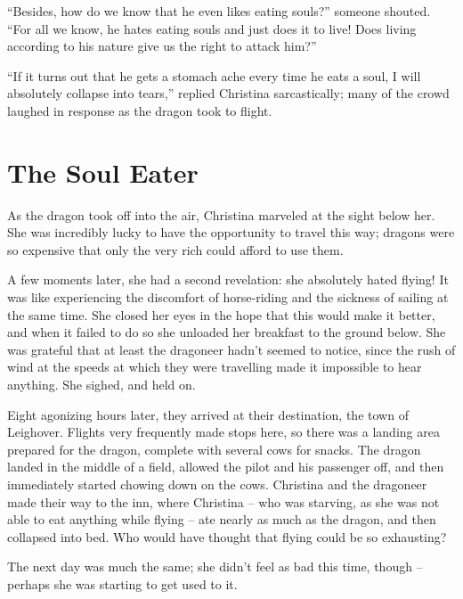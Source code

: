 \documentclass[showtrims,b6paper,draft,10pt]{memoir}
\begin{document}
``Besides, how do we know that he even likes eating souls?''  someone shouted.  ``For all we know, he hates eating souls and just does it to live!  Does living according to his nature give us the right to attack him?''

``If it turns out that he gets a stomach ache every time he eats a soul, I will absolutely collapse into tears,'' replied Christina sarcastically;  many of the crowd laughed in response as the dragon took to flight.

\timeskip
\chapter{The Soul Eater}

As the dragon took off into the air, Christina marveled at the sight below her.  She was incredibly lucky to have the opportunity to travel this way;  dragons were so expensive that only the very rich could afford to use them.

A few moments later, she had a second revelation:  she absolutely hated flying!  It was like experiencing the discomfort of horse-riding and the sickness of sailing at the same time.  She closed her eyes in the hope that this would make it better, and when it failed to do so she unloaded her breakfast to the ground below.  She was grateful that at least the dragoneer hadn't seemed to notice, since the rush of wind at the speeds at which they were travelling made it impossible to hear anything.  She sighed, and held on.

Eight agonizing hours later, they arrived at their destination, the town of Leighover.  Flights very frequently made stops here, so there was a landing area prepared for the dragon, complete with several cows for snacks.  The dragon landed in the middle of a field, allowed the pilot and his passenger off, and then immediately started chowing down on the cows.  Christina and the dragoneer made their way to the inn, where Christina -- who was starving, as she was not able to eat anything while flying -- ate nearly as much as the dragon, and then collapsed into bed.  Who would have thought that flying could be so exhausting?

The next day was much the same;  she didn't feel as bad this time, though -- perhaps she was starting to get used to it.
\end{document}
